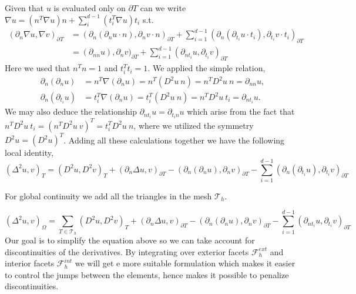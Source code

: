 Given that $u$ is evaluated only on $\partial T$ can we write
$\nabla u = \left( n^{T} \nabla u   \right) n + \sum_i^{d-1} \left( t_i^{T} \nabla u   \right) t_i$ s.t.
\[
    \begin{split}
(  \partial_n\nabla u, \nabla v ) _{\partial_{} T  } & =  ( \partial _{n} ( \partial_{n}u \cdot n), \partial _{n} v \cdot n )_{\partial T}   +\sum_{i=1}^{d-1} ( \partial _{n} ( \partial_{t_{i}}u \cdot t_{i}), \partial _{t_{i}} v \cdot t_{i} )_{\partial T} \\
& =  ( \partial _{nn} u ), \partial _{n} v  )_{\partial T}+\sum_{i=1}^{d-1} ( \partial _{n t_{i}}u , \partial _{t_{i}} v  )_{\partial T}
    \end{split}
\]
Here we used that $n^{T} n = 1$ and $t_{i}^{T} t_{i} = 1$.
We applied the simple relation,
    \begin{align*}
\partial_n (\partial_n u)  & = n^T \nabla (\partial_n u)  = n ^T (D^2 u \ n)  = n^{T} D^2 u \ n = \partial _{nn} u, \\
\partial_n (\partial_{t_{i}} u)  & = t_{i}^T \nabla (\partial_n u)  = t_i^T (D^2 u \ n )   = n^{T} D^2 u \ t_{i} = \partial _{n t_{i}} u.
    \end{align*}
We may also deduce the relationship $\partial _{nt_{i}} u = \partial _{t_{i}n}u$ which arise from the fact that $n^{T} D^2u \ t_{i} = ( n^{T} D^2u \ v )^T = t_{i}^{T}  D^2u \  n$, where we utilized the symmetry $D^2u = ( D^2u) ^{T} $.
Adding all these calculations together we have the following local identity,
\[
( \Delta ^2 u, v) _{T}   = ( D^2 u, D^2v)_{T } + ( \partial _{n}  \Delta u, v )_{\partial T} -( \partial _{n} ( \partial_{n}u ), \partial _{n} v  )_{\partial T}-\sum_{i=1}^{d-1} ( \partial _{n} ( \partial_{t_{i}}u ), \partial _{t_{i}} v  )_{\partial T}
\]

For global continuity we add all the triangles in the mesh $\mathcal{T} _{h}$.

\begin{equation}
\label{eq:bi_basic_dg2}
\left( \Delta  ^{2} u,v \right) _{\Omega } = \sum_{T \in  \mathcal{T} _{h}}^{}  ( D^2 u, D^2v)_{T } + ( \partial _{n}  \Delta u, v )_{\partial T} -( \partial _{n} ( \partial_{n}u ), \partial _{n} v  )_{\partial T}-\sum_{i=1}^{d-1} ( \partial _{n t_{i}} u , \partial _{t_{i}} v  )_{\partial T}
\end{equation}
Our goal is to simplify the equation above so we can take account for discontinuities of the derivatives.
By integrating over exterior facets $\mathcal{F} _{h}^{ext}$ and interior facets $\mathcal{F} _{h}^{int}$ we will get e more suitable formulation which makes it easier to control the jumps between the elements, hence makes it possible to penalize discontinuities.

